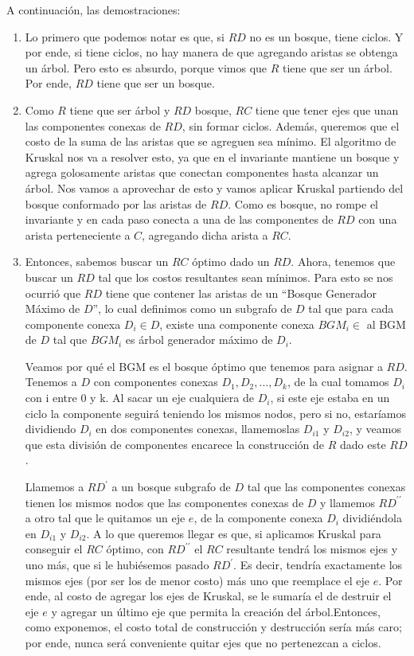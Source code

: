 A continuación, las demostraciones:

\begin{enumerate}
	\item Lo primero que podemos notar es que, si $RD$ no es un bosque, tiene ciclos. Y por ende, si tiene ciclos, no hay manera de que agregando aristas se obtenga un árbol. Pero esto es absurdo, porque vimos que $R$ tiene que ser un árbol. Por ende, $RD$ tiene que ser un bosque.

	\item Como $R$ tiene que ser árbol y $RD$ bosque, $RC$ tiene que tener ejes que unan las componentes conexas de $RD$, sin formar ciclos. Además, queremos que el costo de la suma de las aristas que se agreguen sea mínimo. El algoritmo de Kruskal nos va a resolver esto, ya que en el invariante mantiene un bosque y agrega golosamente aristas que conectan componentes hasta alcanzar un árbol. Nos vamos a aprovechar de esto y vamos aplicar Kruskal partiendo del bosque conformado por las aristas de $RD$. Como es bosque, no rompe el invariante y en cada paso conecta a una de las componentes de $RD$ con una arista perteneciente a $C$, agregando dicha arista a $RC$. %

	\item Entonces, sabemos buscar un $RC$ óptimo dado un $RD$. Ahora, tenemos que buscar un $RD$ tal que los costos resultantes sean mínimos. Para esto se nos ocurrió que $RD$ tiene que contener las aristas de un “Bosque Generador Máximo de $D$”, lo cual definimos como un subgrafo de $D$ tal que para cada componente conexa $D_i \in D$, existe una componente conexa $BGM_i \in$ al BGM de $D$ tal que $BGM_i$ es árbol generador máximo de $D_i$.

Veamos por qué el BGM es el bosque óptimo que tenemos para asignar a $RD$. Tenemos a $D$ con componentes conexas $D_1 , D_2 , ... , D_k$, de la cual tomamos $D_i$ con i entre 0 y k. Al sacar un eje cualquiera de $D_i$, si este eje estaba en un ciclo la componente seguirá teniendo los mismos nodos, pero si no, estaríamos dividiendo $D_i$ en dos componentes conexas, llamemoslas $D_{i1}$ y $D_{i2}$, y veamos que esta división de componentes encarece la construcción de $R$ dado este $RD$. 

Llamemos a $RD^{\prime}$ a un bosque subgrafo de $D$ tal que las componentes conexas tienen los mismos nodos que las componentes conexas de $D$ y llamemos $RD^{\prime\prime}$ a otro tal que le quitamos un eje $e$, de la componente conexa $D_i$ dividiéndola en $D_{i1}$ y $D_{i2}$. A lo que queremos llegar es que, si aplicamos Kruskal para conseguir el $RC$ óptimo, con $RD^{\prime\prime}$ el $RC$ resultante tendrá los mismos ejes y uno más, que si le hubiésemos pasado $RD^{\prime}$. Es decir, tendría exactamente los mismos ejes (por ser los de menor costo) más uno que reemplace el eje $e$. Por ende, al costo de agregar los ejes de Kruskal, se le sumaría el de destruir el eje $e$ y agregar un último eje que permita la creación del árbol.Entonces, como exponemos, el costo total de construcción y destrucción sería más caro; por ende, nunca será conveniente quitar ejes que no pertenezcan a ciclos. 


\end{enumerate}
